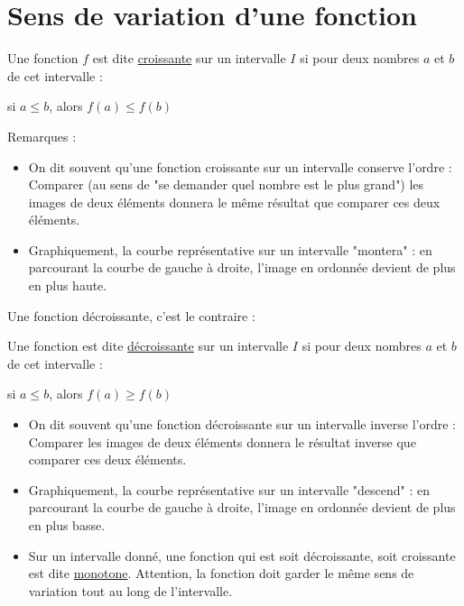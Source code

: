 \documentclass[10pt,a4paper,oneside]{book}
\begin{document}
\section{Sens de variation d'une fonction}

\begin{de}
    Une fonction $f$ est dite \underline{croissante} sur un intervalle $I$ si pour deux nombres $a$ et $b$ de cet intervalle :
    \vspace{0.3cm}
    \begin{center}
    si $a \leq b$,  alors $f(a) \leq f(b)$
    \end{center}
\end{de}

Remarques :
\begin{itemize}
    \item On dit souvent qu'une fonction croissante sur un intervalle conserve l'ordre : Comparer (au sens de "se demander quel nombre est le plus grand") les images de deux éléments donnera le même résultat que comparer ces deux éléments.
    \item Graphiquement, la courbe représentative sur un intervalle "montera" : en parcourant la courbe de gauche à droite, l'image en ordonnée devient de plus en plus haute.
\end{itemize}

Une fonction décroissante, c'est le contraire :

\begin{de}
    Une fonction est dite \underline{décroissante} sur un intervalle $I$ si pour deux nombres $a$ et $b$ de cet intervalle :
    \vspace{0.3cm}
    \begin{center}
    si $a \leq b$,  alors $f(a) \geq f(b)$
    \end{center}
\end{de}

\begin{itemize}
    \item On dit souvent qu'une fonction décroissante sur un intervalle inverse l'ordre : Comparer les images de deux éléments donnera le résultat inverse que comparer ces deux éléments.
    \item Graphiquement, la courbe représentative sur un intervalle "descend" : en parcourant la courbe de gauche à droite, l'image en ordonnée devient de plus en plus basse.
    \item Sur un intervalle donné, une fonction qui est soit décroissante, soit croissante est dite \underline{monotone}. Attention, la fonction doit garder le même sens de variation tout au long de l'intervalle.
\end{itemize}
\end{document}
